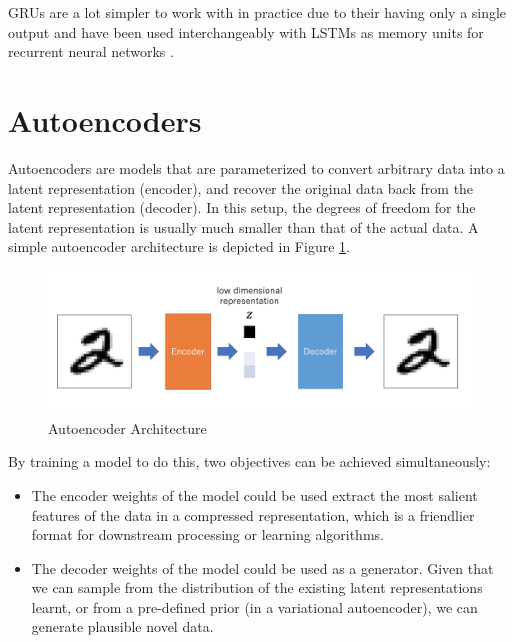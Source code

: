 GRUs are a lot simpler to work with in practice due to their having only a single output and have been used interchangeably with LSTMs as memory units for recurrent neural networks \citep{chung2015gated}.


\section{Autoencoders}

Autoencoders are models that are parameterized to convert arbitrary data into a latent representation (encoder), and recover the original data back from the latent representation (decoder). In this setup, the degrees of freedom for the latent representation is usually much smaller than that of the actual data. A simple autoencoder architecture is depicted in Figure \ref{fig:autoencoder-structure}.

\begin{figure}[ht]
	\centering
	\includegraphics[width=\textwidth]{images/autoencoder-structure}
	\caption{\label{fig:autoencoder-structure} Autoencoder Architecture}
\end{figure}

By training a model to do this, two objectives can be achieved simultaneously:
\begin{itemize}
	\item The encoder weights of the model could be used extract the most salient features of the data in a compressed representation, which is a friendlier format for downstream processing or learning algorithms. \citep{hinton2006reducing}
	\item The decoder weights of the model could be used as a generator. Given that we can sample from the distribution of the existing latent representations learnt, or from a pre-defined prior (in a variational autoencoder), we can generate plausible novel data.
\end{itemize}

